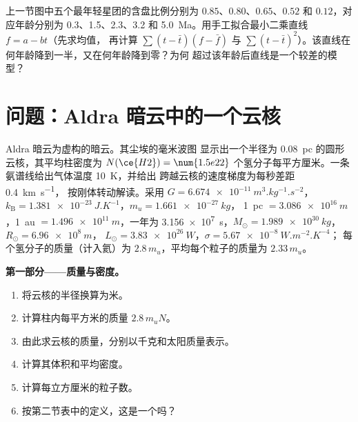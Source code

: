 \begin{exercise}[$\star\star\star$]\label{exo:b2:ism-star-formation:12}
上一节图中五个最年轻星团的含盘比例分别为
$0.85$、$0.80$、$0.65$、$0.52$ 和 $0.12$，对应年龄分别为 0.3、1.5、2.3、3.2 和
\qty{5.0}{Ma}。用手工拟合最小二乘直线 $f = a - bt$（先求均值，
再计算 $\sum(t - \bar t)(f - \bar f)$ 与
$\sum(t - \bar t)^2$）。该直线在何年龄降到一半，又在何年龄降到零？为何
超过该年龄后直线是一个较差的模型？
\end{exercise}

\section{问题：Aldra 暗云中的一个云核}

\begin{problem}
\label{pb:b2:ism-star-formation:1}
Aldra 暗云为虚构的暗云。其尘埃的毫米波图
显示出一个半径为 \qty{0.08}{pc} 的圆形云核，其平均柱密度为
$N(\ce{H2}) = \num{1.5e22}$ 个氢分子每平方厘米。一条
氨谱线给出气体温度 \qty{10}{K}，并给出
跨越云核的速度梯度为每秒差距 \qty{0.4}{km.s^{-1}}，
按刚体转动解读。采用 $G = \qty{6.674e-11}{m^3.kg^{-1}.s^{-2}}$，
$k_{\mathrm B} = \qty{1.381e-23}{J.K^{-1}}$，$m_u = \qty{1.661e-27}{kg}$，
\qty{1}{pc} $= \qty{3.086e16}{m}$，\qty{1}{au} $= \qty{1.496e11}{m}$，一年为
\qty{3.156e7}{s}，$M_\odot = \qty{1.989e30}{kg}$，$R_\odot = \qty{6.96e8}{m}$，
$L_\odot = \qty{3.83e26}{W}$，$\sigma = \qty{5.67e-8}{W.m^{-2}.K^{-4}}$；
每个氢分子的质量（计入氦）为 $2.8\,m_u$，平均每个粒子的质量为
$2.33\,m_u$。

\medskip
\noindent\textbf{第一部分——质量与密度。}
\begin{enumerate}
  \item 将云核的半径换算为米。
  \item 计算柱内每平方米的质量 $2.8\,m_u N$。
  \item 由此求云核的质量，分别以千克和太阳质量表示。
  \item 计算其体积和平均密度。
  \item 计算每立方厘米的粒子数。
  \item 按第二节表中的定义，这是一个吗？
\end{enumerate}


\end{problem}
